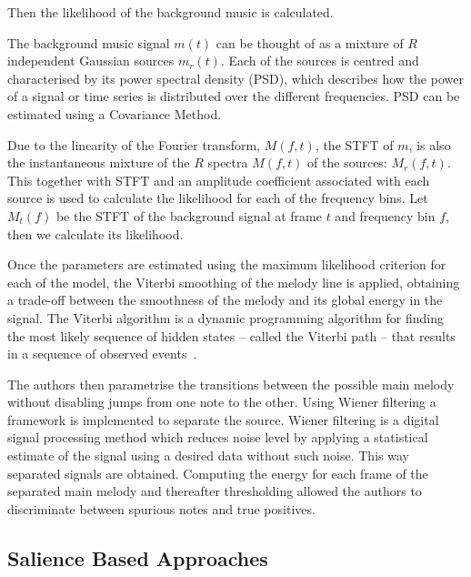 Then the likelihood of the background music is calculated.

The background music signal $m(t)$ can be thought of as a mixture of $R$ independent Gaussian sources $m_{r}(t)$. Each of the sources is centred and characterised by its power spectral density (PSD), which describes how the power of a signal or time series is distributed over the different frequencies. PSD can be estimated using a Covariance Method.

Due to the linearity of the Fourier transform, $M(f,t)$, the STFT of $m$, is also the instantaneous mixture of the $R$ spectra $M(f,t)$ of the sources: $M_{r}(f,t)$.
This together with STFT and an amplitude coefficient associated with each source is used to calculate the likelihood for each of the frequency bins. Let $M_{t}(f)$ be the STFT of the background signal at frame $t$ and frequency bin $f$, then we calculate its likelihood.

Once the parameters are estimated using the maximum likelihood criterion for each of the model, the Viterbi smoothing of the melody line is applied, obtaining a trade-off between the smoothness of the melody and its global energy in the signal. The Viterbi algorithm is a dynamic programming algorithm for finding the most likely sequence of hidden states – called the Viterbi path – that results in a sequence of observed events~\cite{viterbi}.
 
The authors then parametrise the transitions between the possible main melody without disabling jumps from one note to the other. Using Wiener filtering a framework is implemented to separate the source. Wiener filtering is a digital signal processing method which reduces noise level by applying a statistical estimate of the signal using a desired data without such noise. This way separated signals are obtained. Computing the energy for each frame of the separated main melody and thereafter thresholding allowed the authors to discriminate between spurious notes and true positives.

\vspace{20pt}


\subsection{Salience Based Approaches}

